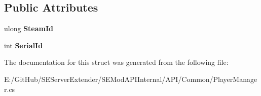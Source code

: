 \subsection*{Public Attributes}
\begin{DoxyCompactItemize}
\item 
\hypertarget{struct_s_e_mod_a_p_i_internal_1_1_a_p_i_1_1_common_1_1_player_map_1_1_internal_client_item_ab205a80364bf75a8f6cf4e3d5238b2dc}{}ulong {\bfseries Steam\+Id}\label{struct_s_e_mod_a_p_i_internal_1_1_a_p_i_1_1_common_1_1_player_map_1_1_internal_client_item_ab205a80364bf75a8f6cf4e3d5238b2dc}

\item 
\hypertarget{struct_s_e_mod_a_p_i_internal_1_1_a_p_i_1_1_common_1_1_player_map_1_1_internal_client_item_acaa5e2ff284d70556cf14cd11db942ee}{}int {\bfseries Serial\+Id}\label{struct_s_e_mod_a_p_i_internal_1_1_a_p_i_1_1_common_1_1_player_map_1_1_internal_client_item_acaa5e2ff284d70556cf14cd11db942ee}

\end{DoxyCompactItemize}


The documentation for this struct was generated from the following file\+:\begin{DoxyCompactItemize}
\item 
E\+:/\+Git\+Hub/\+S\+E\+Server\+Extender/\+S\+E\+Mod\+A\+P\+I\+Internal/\+A\+P\+I/\+Common/Player\+Manager.\+cs\end{DoxyCompactItemize}
